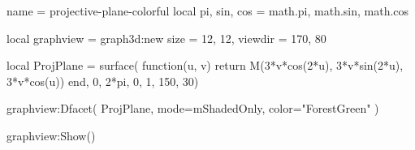 \documentclass{standalone}
\begin{document}
\begin{luadraw}{name = projective-plane-colorful}
local pi, sin, cos = math.pi, math.sin, math.cos

local graphview = graph3d:new{
  size    = {12, 12},
  viewdir = {170, 80}
}

local ProjPlane =  surface(
  function(u, v) 
    return M(3*v*cos(2*u), 3*v*sin(2*u), 3*v*cos(u))
  end, 
  0, 2*pi, 0, 1, 
  {150, 30})

graphview:Dfacet(
  ProjPlane, 
  {
    mode=mShadedOnly, 
    color="ForestGreen"
  })

graphview:Show()
\end{luadraw}
\end{document}
